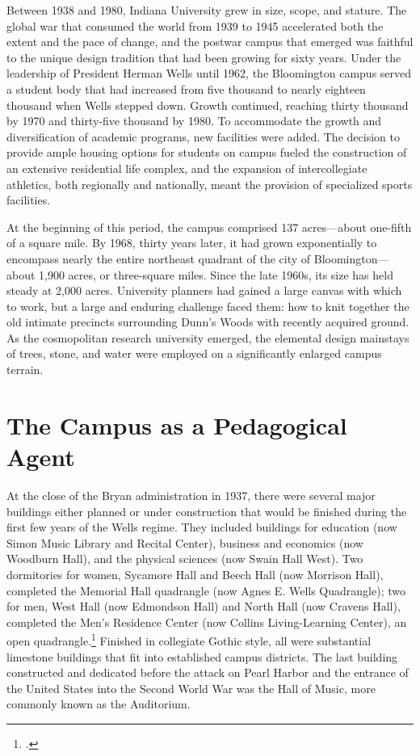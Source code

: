 \documentclass[
  american,
  letterpaper,
]{scrreprt}
\begin{document}
Between 1938 and 1980, Indiana University grew in size, scope, and
stature. The global war that consumed the world from 1939 to 1945
accelerated both the extent and the pace of change, and the postwar
campus that emerged was faithful to the unique design tradition that had
been growing for sixty years. Under the leadership of President Herman
Wells until 1962, the Bloomington campus served a student body that had
increased from five thousand to nearly eighteen thousand when Wells
stepped down. Growth continued, reaching thirty thousand by 1970 and
thirty-five thousand by 1980. To accommodate the growth and
diversification of academic programs, new facilities were added. The
decision to provide ample housing options for students on campus fueled
the construction of an extensive residential life complex, and the
expansion of intercollegiate athletics, both regionally and nationally,
meant the provision of specialized sports facilities.

At the beginning of this period, the campus comprised 137 acres---about
one-fifth of a square mile. By 1968, thirty years later, it had grown
exponentially to encompass nearly the entire northeast quadrant of the
city of Bloomington---about 1,900 acres, or three-square miles. Since
the late 1960s, its size has held steady at 2,000 acres. University
planners had gained a large canvas with which to work, but a large and
enduring challenge faced them: how to knit together the old intimate
precincts surrounding Dunn's Woods with recently acquired ground. As the
cosmopolitan research university emerged, the elemental design mainstays
of trees, stone, and water were employed on a significantly enlarged
campus terrain.

\section{The Campus as a Pedagogical
Agent}\label{the-campus-as-a-pedagogical-agent}

At the close of the Bryan administration in 1937, there were several
major buildings either planned or under construction that would be
finished during the first few years of the Wells regime. They included
buildings for education (now Simon Music Library and Recital Center),
business and economics (now Woodburn Hall), and the physical sciences
(now Swain Hall West). Two dormitories for women, Sycamore Hall and
Beech Hall (now Morrison Hall), completed the Memorial Hall quadrangle
(now Agnes E. Wells Quadrangle); two for men, West Hall (now Edmondson
Hall) and North Hall (now Cravens Hall), completed the Men's Residence
Center (now Collins Living-Learning Center), an open
quadrangle.\footnote{.} Finished
in collegiate Gothic style, all were substantial limestone buildings
that fit into established campus districts. The last building
constructed and dedicated before the attack on Pearl Harbor and the
entrance of the United States into the Second World War was the Hall of
Music, more commonly known as the Auditorium.
\end{document}
